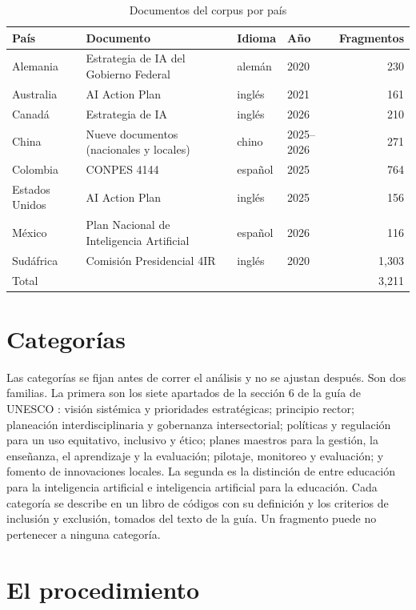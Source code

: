 \begin{table}[htbp]
\centering
\small
\caption{Documentos del corpus por país}
\label{tab:corpus}
\begin{tabular}{llllr}
\hline
País & Documento & Idioma & Año & Fragmentos \\
\hline
Alemania & Estrategia de IA del Gobierno Federal & alemán & 2020 & 230 \\
Australia & AI Action Plan & inglés & 2021 & 161 \\
Canadá & Estrategia de IA & inglés & 2026 & 210 \\
China & Nueve documentos (nacionales y locales) & chino & 2025--2026 & 271 \\
Colombia & CONPES 4144 & español & 2025 & 764 \\
Estados Unidos & AI Action Plan & inglés & 2025 & 156 \\
México & Plan Nacional de Inteligencia Artificial & español & 2026 & 116 \\
Sudáfrica & Comisión Presidencial 4IR & inglés & 2020 & 1{,}303 \\
\hline
\multicolumn{4}{l}{Total} & 3{,}211 \\
\hline
\end{tabular}
\end{table}

\section{Categorías}
\label{sec:categorias}

Las categorías se fijan antes de correr el análisis y no se ajustan después. Son dos
familias. La primera son los siete apartados de la sección 6 de la guía de UNESCO
\citep{miao2021guidance}: visión sistémica y prioridades estratégicas; principio rector;
planeación interdisciplinaria y gobernanza intersectorial; políticas y regulación para un
uso equitativo, inclusivo y ético; planes maestros para la gestión, la enseñanza, el
aprendizaje y la evaluación; pilotaje, monitoreo y evaluación; y fomento de innovaciones
locales. La segunda es la distinción de \citet{schiff2022education} entre educación para la
inteligencia artificial e inteligencia artificial para la educación. Cada categoría se
describe en un libro de códigos con su definición y los criterios de inclusión y exclusión,
tomados del texto de la guía. Un fragmento puede no pertenecer a ninguna categoría.

\section{El procedimiento}
\label{sec:procedimiento}

